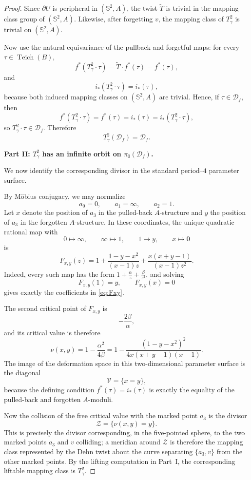 \documentclass[11pt]{article}
\theoremstyle{remark}
\newcommand{\Dsp}{\mathcal D_f}
\newcommand{\Teich}{\operatorname{Teich}}
\begin{document}
\begin{proof}
Since \(\partial U\) is peripheral in \((\mathbb S^2,A)\), the twist \(\widetilde T\) is
trivial in the mapping class group of \((\mathbb S^2,A)\). Likewise, after forgetting \(v\),
the mapping class of \(T_\gamma^2\) is trivial on \((\mathbb S^2,A)\).

Now use the natural equivariance of the pullback and forgetful maps: for every
\(\tau\in \Teich(B)\),
\[
f^*(T_\gamma^2\cdot \tau)=\widetilde T\cdot f^*(\tau)=f^*(\tau),
\]
and
\[
i_*(T_\gamma^2\cdot \tau)=i_*(\tau),
\]
because both induced mapping classes on \((\mathbb S^2,A)\) are trivial. Hence, if
\(\tau\in \Dsp\), then
\[
f^*(T_\gamma^2\cdot \tau)=f^*(\tau)=i_*(\tau)=i_*(T_\gamma^2\cdot \tau),
\]
so \(T_\gamma^2\cdot \tau\in \Dsp\). Therefore
\[
T_\gamma^2(\Dsp)=\Dsp.
\]

\medskip
\noindent
\textbf{Part II: \(T_\gamma^2\) has an infinite orbit on \(\pi_0(\Dsp)\).}

We now identify the corresponding divisor in the standard period--$4$ parameter surface.

By Möbius conjugacy, we may normalize
\[
a_0=0,\qquad a_1=\infty,\qquad a_2=1.
\]
Let \(x\) denote the position of \(a_3\) in the pulled-back \(A\)-structure and
\(y\) the position of \(a_3\) in the forgotten \(A\)-structure. In these coordinates,
the unique quadratic rational map with
\[
0\mapsto \infty,\qquad \infty\mapsto 1,\qquad 1\mapsto y,\qquad x\mapsto 0
\]
is
\begin{equation}\label{eq:Fxy}
F_{x,y}(z)=1+\frac{1-y-x^2}{(x-1)z}+\frac{x(x+y-1)}{(x-1)z^2}.
\end{equation}
Indeed, every such map has the form \(1+\frac{\alpha}{z}+\frac{\beta}{z^2}\), and solving
\[
F_{x,y}(1)=y,\qquad F_{x,y}(x)=0
\]
gives exactly the coefficients in \eqref{eq:Fxy}.

The second critical point of \(F_{x,y}\) is
\[
-\frac{2\beta}{\alpha},
\]
and its critical value is therefore
\begin{equation}\label{eq:nu}
\nu(x,y)=1-\frac{\alpha^2}{4\beta}
      =1-\frac{(1-y-x^2)^2}{4x(x+y-1)(x-1)}.
\end{equation}
The image of the deformation space in this two-dimensional parameter surface is the diagonal
\[
\mathcal V=\{x=y\},
\]
because the defining condition \(f^*(\tau)=i_*(\tau)\) is exactly the equality of the pulled-back
and forgotten \(A\)-moduli.

Now the collision of the free critical value with the marked point \(a_3\) is the divisor
\[
\mathcal Z=\{\nu(x,y)=y\}.
\]
This is precisely the divisor corresponding, in the five-pointed sphere, to the two marked
points \(a_3\) and \(v\) colliding; a meridian around \(\mathcal Z\) is therefore the
mapping class represented by the Dehn twist about the curve separating \(\{a_3,v\}\) from
the other marked points. By the lifting computation in Part~I, the corresponding liftable
mapping class is \(T_\gamma^2\).


\end{proof}
\end{document}
